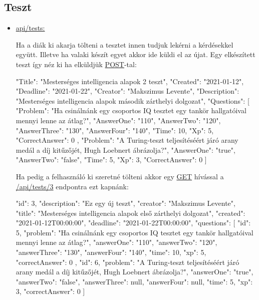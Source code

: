 \subsection{Teszt}
\begin{itemize}[label={$\bullet$}, topsep=0pt, itemsep=0pt, leftmargin=15pt]
    \item[] {\url{api/tests:}}
          \begin{addmargin}[\parindent]{0pt}
              Ha a diák ki akarja tölteni a tesztet innen tudjuk lekérni a kérdésekkel együtt. Illetve ha valaki készít egyet akkor ide küldi el az újat.
              Egy elkészített teszt így néz ki ha elküldjük \url{POST}-tal:
              \begin{json}
{
    "Title": "Mesterséges intelligencia alapok 2 teszt",
    "Created": "2021-01-12",
    "Deadline": "2021-01-22",
    "Creator": "Makszimus Levente",
    "Description": "Mesterséges intelligencia alapok második zárthelyi dolgozat",
    "Questions": [
        {
            "Problem": "Ha csinálnánk egy csoportos IQ tesztet egy tankör hallgatóival mennyi lenne az átlag?",
            "AnswerOne": "110",
            "AnswerTwo": "120",
            "AnswerThree": "130",
            "AnswerFour": "140",
            "Time": 10,
            "Xp": 5,
            "CorrectAnswer": 0
        },
        {
            "Problem": "A Turing-teszt teljesítéséért járó arany medál a díj kitűzőjét, Hugh Loebnert ábrázolja?",
            "AnswerOne": "true",
            "AnswerTwo": "false",
            "Time": 5,
            "Xp": 3,
            "CorrectAnswer": 0
        }
    ]
}
                \end{json}

              Ha pedig a felhasználó ki szeretné tölteni akkor egy \url{GET} hívással a \url{/api/tests/3} endpontra ezt kapnánk:
              \begin{json}
{
    "id": 3,
    "description": "Ez egy új teszt",
    "creator": "Makszimus Levente",
    "title": "Mesterséges intelligencia alapok első zárthelyi dolgozat",
    "created": "2021-01-12T00:00:00",
    "deadline": "2021-01-22T00:00:00",
    "questions": [
        {
            "id": 5,
            "problem": "Ha csinálnánk egy csoportos IQ tesztet egy tankör hallgatóival mennyi lenne az átlag?",
            "answerOne": "110",
            "answerTwo": "120",
            "answerThree": "130",
            "answerFour": "140",
            "time": 10,
            "xp": 5,
            "correctAnswer": 0
        },
        {
            "id": 6,
            "problem": "A Turing-teszt teljesítéséért járó arany medál a díj kitűzőjét, Hugh Loebnert ábrázolja?",
            "answerOne": "true",
            "answerTwo": "false",
            "answerThree": null,
            "answerFour": null,
            "time": 5,
            "xp": 3,
            "correctAnswer": 0
        }
    ]
}
                    \end{json}
          \end{addmargin}
\end{itemize}


